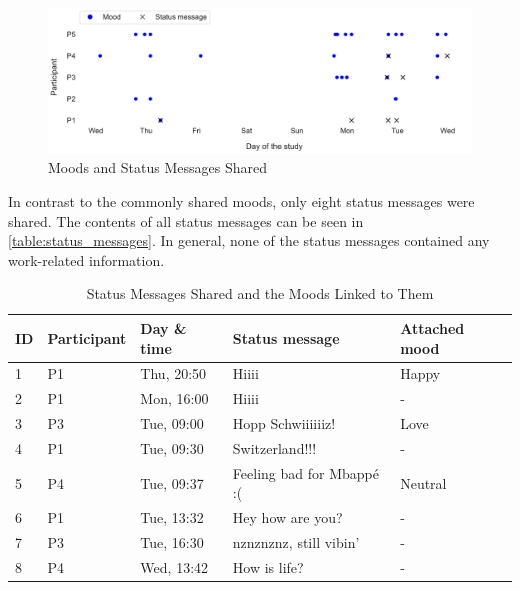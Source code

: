 \begin{figure}[h]
    \centering
    \includegraphics[width=\linewidth]{plots/moods_status_messages.pdf}
    \caption{Moods and Status Messages Shared}
    \label{fig:moods_status_messages}
\end{figure}


In contrast to the commonly shared moods, only eight status messages were shared. The contents of all status messages can be seen in \autoref{table:status_messages}. In general, none of the status messages contained any work-related information.

\begin{table}[h] \footnotesize
    \centering
    \begin{tabularx}{.8\textwidth}{l l l l l}
        \toprule
        ID & Participant & Day \& time & Status message            & Attached mood \\
        \midrule
        1  & P1          & Thu, 20:50  & Hiiii                     & Happy         \\
        2  & P1          & Mon, 16:00  & Hiiii                     & -             \\
        3  & P3          & Tue, 09:00  & Hopp Schwiiiiiiz!         & Love          \\
        4  & P1          & Tue, 09:30  & Switzerland!!!            & -             \\
        5  & P4          & Tue, 09:37  & Feeling bad for Mbappé :( & Neutral       \\
        6  & P1          & Tue, 13:32  & Hey how are you?          & -             \\
        7  & P3          & Tue, 16:30  & nznznznz, still vibin'    & -             \\
        8  & P4          & Wed, 13:42  & How is life?              & -             \\
        \bottomrule
    \end{tabularx}
    \caption{Status Messages Shared and the Moods Linked to Them}
    \label{table:status_messages}
\end{table}

